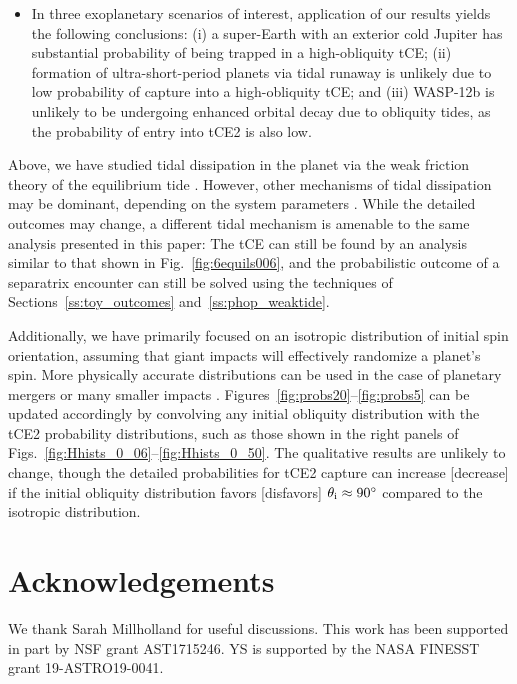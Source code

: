 \documentclass[
        fleqn,
        usenatbib,
    ]{mnras}
\begin{document}
\begin{itemize}
    \item In three exoplanetary scenarios of interest, application of our
        results yields the following conclusions: (i) a super-Earth with an
        exterior cold Jupiter has substantial probability of being trapped in a
        high-obliquity tCE\@; (ii) formation of ultra-short-period planets via
        tidal runaway is unlikely due to low probability of capture into a
        high-obliquity tCE\@; and (iii) WASP-12b is unlikely to be undergoing
        enhanced orbital decay due to obliquity tides, as the probability of
        entry into tCE2 is also low.
\end{itemize}

Above, we have studied tidal dissipation in the planet via the weak friction
theory of the equilibrium tide \citep{lai2012}. However, other mechanisms of
tidal dissipation may be dominant, depending on the system parameters
\citep[e.g.][]{papaloizou_ivanov_inertial, teyssandier2019formation}. While the
detailed outcomes may change, a different tidal mechanism is amenable to the
same analysis presented in this paper: The tCE can still be found by an analysis
similar to that shown in Fig.~\ref{fig:6equils006}, and the probabilistic
outcome of a separatrix encounter can still be solved using the techniques of
Sections~\ref{ss:toy_outcomes} and~\ref{ss:phop_weaktide}.

Additionally, we have primarily focused on an isotropic distribution of initial
spin orientation, assuming that giant impacts will effectively randomize a
planet's spin. More physically accurate distributions can be used in the case of
planetary mergers \citep{li2020planetary} or many smaller impacts
\citep{dones1993does}. Figures~\ref{fig:probs20}--\ref{fig:probs5} can be
updated accordingly by convolving any initial obliquity distribution with the
tCE2 probability distributions, such as those shown in the right panels of
Figs.~\ref{fig:Hhists_0_06}--\ref{fig:Hhists_0_50}. The qualitative results are
unlikely to change, though the detailed probabilities for tCE2 capture can
increase [decrease] if the initial obliquity distribution favors [disfavors]
$\theta_{\rm i} \approx 90^\circ$ compared to the isotropic distribution.

\section{Acknowledgements}

We thank Sarah Millholland for useful discussions. This work has been supported
in part by NSF grant AST1715246. YS is supported by the NASA FINESST grant
19-ASTRO19-0041.%
\end{document}
